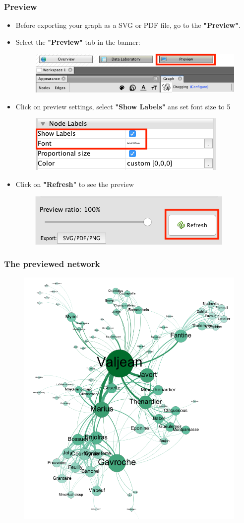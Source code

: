 \documentclass[10pt]{beamer}
\begin{document}
\begin{frame}
\frametitle{Preview}
\begin{itemize}
	\item Before exporting your graph as a SVG or PDF file, go to the \textbf{"Preview"}.

	\item Select the \textbf{"Preview"} tab in the banner:
		\begin{figure}
			\includegraphics[width=0.4\linewidth]{figures/preview.png}
		\end{figure}
	\item Click on preview settings, select \textbf{"Show Labels"} ans set font size to 5
		\begin{figure}
			\includegraphics[width=0.4\linewidth]{figures/preview_font.png}
		\end{figure}
	\item Click on \textbf{"Refresh"} to see the preview
		\begin{figure}
			\includegraphics[width=0.4\linewidth]{figures/refresh.png}
		\end{figure}
\end{itemize}
\end{frame}

\begin{frame}
\frametitle{The previewed network}
\begin{figure}
	\includegraphics[width=0.4\linewidth]{figures/preview_final.png}
\end{figure}
\end{frame}
\end{document}
